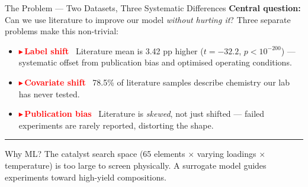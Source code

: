 \documentclass[aspectratio=169,12pt]{beamer}
\newcommand{\badge}[2]{%
  {\footnotesize\bfseries\textcolor{#1}{$\blacktriangleright$\,#2}}}
\newcommand{\sidenote}[1]{%
  \vspace{4pt}%
  \noindent\textcolor{accent}{\rule{2pt}{0.9em}}\hspace{7pt}%
  \parbox[t]{0.90\linewidth}{\scriptsize\color{darkgray}#1}%
  \vspace{2pt}}
\begin{document}
\begin{frame}{The Problem — Two Datasets, Three Systematic Differences}
  \vspace{5pt}
  \textbf{Central question:} Can we use literature to improve our model
  \emph{without hurting it}? Three separate problems make this non-trivial:

  \vspace{3pt}
  \small
  \begin{itemize}
    \item \badge{red}{Label shift} \ Literature mean is 3.42 pp higher
      ($t = -32.2$, $p < 10^{-200}$) — systematic offset from publication bias
      and optimised operating conditions.
    \item \badge{red}{Covariate shift} \ 78.5\% of literature samples
      describe chemistry our lab has never tested.
    \item \badge{red}{Publication bias} \ Literature is \emph{skewed}, not
      just shifted — failed experiments are rarely reported, distorting the shape.
  \end{itemize}

  \sidenote{Why ML? The catalyst search space (65 elements $\times$ varying
    loadings $\times$ temperature) is too large to screen physically.
    A surrogate model guides experiments toward high-yield compositions.}

\end{frame}
\end{document}

